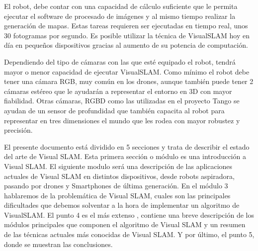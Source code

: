 El robot, debe contar con una capacidad de cálculo suficiente que le permita ejecutar el software de procesado de imágenes y al mismo tiempo realizar la generación de mapas. Estas tareas requieren ser ejecutadas en tiempo real, unos 30 fotogramas por segundo. Es posible utilizar la técnica de VisualSLAM hoy en día en pequeños dispositivos gracias al aumento de su potencia de computación.

Dependiendo del tipo de cámaras con las que esté equipado  el robot,  tendrá mayor o menor capacidad de ejecutar VisualSLAM. Como mínimo el robot debe tener una cámara RGB, muy común en los drones, aunque también puede tener 2 cámaras estéreo que le ayudarán a representar el entorno en 3D con mayor fiabilidad. Otras cámaras, RGBD como las utilizadas en el proyecto Tango se ayudan de un sensor de profundidad que también capacita al robot para representar en tres dimensiones el mundo que les rodea con mayor robustez y precisión.

El presente documento está dividido en 5 secciones y trata de describir el estado del arte de Visual SLAM. Esta primera sección o módulo es una introducción a Visual SLAM. El siguiente modulo será una descripción de las aplicaciones actuales de Visual SLAM en distintos dispositivos, desde robots aspiradora, pasando por drones y Smartphones de última generación. En el módulo 3 hablaremos de la problemática de Visual SLAM, cuales son las principales dificultades que debemos solventar a la hora de implementar un algoritmo de VisualSLAM. El punto 4 es el más extenso , contiene una breve descripción de los módulos principales que componen el algoritmo de Visual SLAM y un resumen de las técnicas actuales más conocidas de Visual SLAM.
Y por último, el punto 5, donde se muestran las conclusiones.

